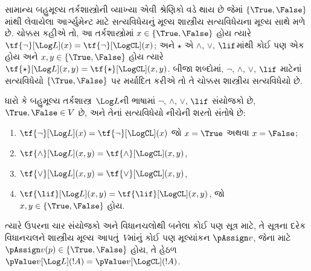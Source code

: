 \begingroup
\makeatletter{}\makeatother


\label{guunit:OLP-0391}


સામાન્ય બહુમૂલ્ય તર્કશાસ્ત્રોની વ્યાખ્યા એવી શ્રેણિકો વડે થાય છે જેમાં
$\{\True, \False\}$માંથી લેવાયેલા આર્ગ્યુમેન્ટ માટે સત્યવિધેયનું
મૂલ્ય શાસ્ત્રીય સત્યવિધેયના મૂલ્ય સાથે મળે છે. ચોક્કસ કહીએ તો, આ
તર્કશાસ્ત્રોમાં $x \in \{\True, \False\}$ હોય ત્યારે
$\tf{\lnot}[\Log L](x) = \tf{\lnot}[\LogCL](x)$; અને $\star$ એ
$\land$, $\lor$, $\lif$માંથી કોઈ પણ એક હોય અને
$x, y \in \{\True, \False\}$ હોય ત્યારે
$\tf{\star}[\Log L](x,y) = \tf{\star}[\LogCL](x,y)$.
બીજા શબ્દોમાં, $\lnot$, $\land$, $\lor$, $\lif$ માટેનાં સત્યવિધેયો
$\{\True,\False\}$ પર મર્યાદિત કરીએ તો તે ચોક્કસ શાસ્ત્રીય
સત્યવિધેયો છે.

\begin{prop}
  ધારો કે બહુમૂલ્ય તર્કશાસ્ત્ર~$\Log L$ની ભાષામાં $\lnot$, $\land$,
  $\lor$, $\lif$ સંયોજકો છે, $\True, \False \in V$ છે, અને તેનાં
  સત્યવિધેયો નીચેની શરતો સંતોષે છે:
  \begin{enumerate}
    \item{} $\tf{\lnot}[\Log L](x) = \tf{\lnot}[\LogCL](x)$ જો $x =
    \True$ અથવા $x = \False$;
    \item{} $\tf{\land}[\Log L](x,y) = \tf{\land}[\LogCL](x,y)$,
    \item{} $\tf{\lor}[\Log L](x,y) = \tf{\lor}[\LogCL](x,y)$,
    \item{} $\tf{\lif}[\Log L](x,y) = \tf{\lif}[\LogCL](x,y)$,
    જો $x, y \in \{\True, \False\}$ હોય.
  \end{enumerate}
  ત્યારે ઉપરના ચાર સંયોજકો અને વિધાનચલોથી બનેલા કોઈ પણ સૂત્ર માટે,
  તે સૂત્રના દરેક વિધાનચલને શાસ્ત્રીય મૂલ્ય આપતું~$V$માંનું
  કોઈ પણ મૂલ્યાંકન $\pAssign v$, જેના માટે
  $\pAssign v(p) \in \{\True,\False\}$ હોય, તે હેઠળ
  $\pValue v[\Log L](!A) = \pValue v[\LogCL](!A)$.
\end{prop}

